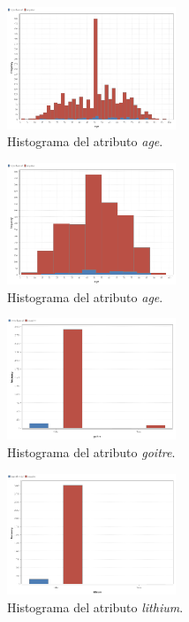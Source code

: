 \documentclass[osajnl,twocolumn,showpacs,superscriptaddress,10pt,floatfix]{revtex4-1} %
\begin{document}
\begin{figure}[H]
    \centering
    \includegraphics[width=0.45\textwidth]{analysis/histogram_age}
    \caption{Histograma del atributo \textit{age}.}
    \label{figure:histogram_age}
\end{figure}

\begin{figure}[H]
    \centering
    \includegraphics[width=0.45\textwidth]{analysis/histogram_age2}
    \caption{Histograma del atributo \textit{age}.}
    \label{figure:histogram_age2}
\end{figure}

\begin{figure}[H]
    \centering
    \includegraphics[width=0.45\textwidth]{analysis/histogram_goitre}
    \caption{Histograma del atributo \textit{goitre}.}
    \label{figure:histogram_goitre}
\end{figure}

\begin{figure}[H]
    \centering
    \includegraphics[width=0.45\textwidth]{analysis/histogram_lithium}
    \caption{Histograma del atributo \textit{lithium}.}
    \label{figure:histogram_lithium}
\end{figure}
\end{document}
